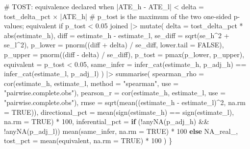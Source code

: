 \documentclass[
  letterpaper,
  DIV=11,
  numbers=noendperiod]{scrartcl}
\newenvironment{Shaded}{\begin{snugshade}}{\end{snugshade}}
\newcommand{\AttributeTok}[1]{\textcolor[rgb]{0.40,0.45,0.13}{#1}}
\newcommand{\CommentTok}[1]{\textcolor[rgb]{0.37,0.37,0.37}{#1}}
\newcommand{\ConstantTok}[1]{\textcolor[rgb]{0.56,0.35,0.01}{#1}}
\newcommand{\ControlFlowTok}[1]{\textcolor[rgb]{0.00,0.23,0.31}{\textbf{#1}}}
\newcommand{\DecValTok}[1]{\textcolor[rgb]{0.68,0.00,0.00}{#1}}
\newcommand{\FloatTok}[1]{\textcolor[rgb]{0.68,0.00,0.00}{#1}}
\newcommand{\FunctionTok}[1]{\textcolor[rgb]{0.28,0.35,0.67}{#1}}
\newcommand{\NormalTok}[1]{\textcolor[rgb]{0.00,0.23,0.31}{#1}}
\newcommand{\SpecialCharTok}[1]{\textcolor[rgb]{0.37,0.37,0.37}{#1}}
\newcommand{\StringTok}[1]{\textcolor[rgb]{0.13,0.47,0.30}{#1}}
\begin{document}
\begin{Shaded}
\begin{Highlighting}[]
  \CommentTok{\# TOST: equivalence declared when |ATE\_h {-} ATE\_l| \textless{} delta = tost\_delta\_pct × |ATE\_h|}
  \CommentTok{\# p\_tost is the maximum of the two one{-}sided p{-}values; equivalent if p\_tost \textless{} 0.05}
\NormalTok{  joined }\SpecialCharTok{|\textgreater{}}
    \FunctionTok{mutate}\NormalTok{(}
      \AttributeTok{delta      =}\NormalTok{ tost\_delta\_pct }\SpecialCharTok{*} \FunctionTok{abs}\NormalTok{(estimate\_h),}
      \AttributeTok{diff       =}\NormalTok{ estimate\_h }\SpecialCharTok{{-}}\NormalTok{ estimate\_l,}
      \AttributeTok{se\_diff    =} \FunctionTok{sqrt}\NormalTok{(se\_h}\SpecialCharTok{\^{}}\DecValTok{2} \SpecialCharTok{+}\NormalTok{ se\_l}\SpecialCharTok{\^{}}\DecValTok{2}\NormalTok{),}
      \AttributeTok{p\_lower    =} \FunctionTok{pnorm}\NormalTok{((diff }\SpecialCharTok{+}\NormalTok{ delta) }\SpecialCharTok{/}\NormalTok{ se\_diff, }\AttributeTok{lower.tail =} \ConstantTok{FALSE}\NormalTok{),}
      \AttributeTok{p\_upper    =} \FunctionTok{pnorm}\NormalTok{((diff }\SpecialCharTok{{-}}\NormalTok{ delta) }\SpecialCharTok{/}\NormalTok{ se\_diff),}
      \AttributeTok{p\_tost     =} \FunctionTok{pmax}\NormalTok{(p\_lower, p\_upper),}
      \AttributeTok{equivalent =}\NormalTok{ p\_tost }\SpecialCharTok{\textless{}} \FloatTok{0.05}\NormalTok{,}
      \AttributeTok{same\_infer =} \FunctionTok{infer\_cat}\NormalTok{(estimate\_h, p\_adj\_h) }\SpecialCharTok{==} \FunctionTok{infer\_cat}\NormalTok{(estimate\_l, p\_adj\_l)}
\NormalTok{    ) }\SpecialCharTok{|\textgreater{}}
    \FunctionTok{summarise}\NormalTok{(}
      \AttributeTok{spearman\_rho    =} \FunctionTok{cor}\NormalTok{(estimate\_h, estimate\_l, }\AttributeTok{method =} \StringTok{"spearman"}\NormalTok{,}
                            \AttributeTok{use =} \StringTok{"pairwise.complete.obs"}\NormalTok{),}
      \AttributeTok{pearson\_r       =} \FunctionTok{cor}\NormalTok{(estimate\_h, estimate\_l, }\AttributeTok{use =} \StringTok{"pairwise.complete.obs"}\NormalTok{),}
      \AttributeTok{rmse            =} \FunctionTok{sqrt}\NormalTok{(}\FunctionTok{mean}\NormalTok{((estimate\_h }\SpecialCharTok{{-}}\NormalTok{ estimate\_l)}\SpecialCharTok{\^{}}\DecValTok{2}\NormalTok{, }\AttributeTok{na.rm =} \ConstantTok{TRUE}\NormalTok{)),}
      \AttributeTok{directional\_pct =} \FunctionTok{mean}\NormalTok{(}\FunctionTok{sign}\NormalTok{(estimate\_h) }\SpecialCharTok{==} \FunctionTok{sign}\NormalTok{(estimate\_l), }\AttributeTok{na.rm =} \ConstantTok{TRUE}\NormalTok{) }\SpecialCharTok{*} \DecValTok{100}\NormalTok{,}
      \AttributeTok{inferential\_pct =} \ControlFlowTok{if}\NormalTok{ (}\SpecialCharTok{!}\FunctionTok{anyNA}\NormalTok{(p\_adj\_h) }\SpecialCharTok{\&\&} \SpecialCharTok{!}\FunctionTok{anyNA}\NormalTok{(p\_adj\_l))}
        \FunctionTok{mean}\NormalTok{(same\_infer, }\AttributeTok{na.rm =} \ConstantTok{TRUE}\NormalTok{) }\SpecialCharTok{*} \DecValTok{100} \ControlFlowTok{else} \ConstantTok{NA\_real\_}\NormalTok{,}
      \AttributeTok{tost\_pct        =} \FunctionTok{mean}\NormalTok{(equivalent, }\AttributeTok{na.rm =} \ConstantTok{TRUE}\NormalTok{) }\SpecialCharTok{*} \DecValTok{100}
\NormalTok{    )}
\NormalTok{\}}
\end{Highlighting}
\end{Shaded}
\end{document}
